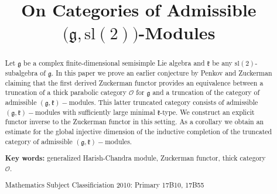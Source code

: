 \documentclass{tglat2e}
\theoremstyle{definition}
\theoremstyle{remark}
\begin{document}
\title[Admissible $\big(\mathfrak{g},\mathrm{sl}(2)\big)$-Modules]
{On  Categories of Admissible $\big(\mathfrak{g},\mathrm{sl}(2)\big)$-Modules}






\maketitle

\begin{abstract} 

	Let $\mathfrak{g}$ be a complex finite-dimensional semisimple Lie algebra and $\mathfrak{k}$ be any $\mathrm{sl}(2)$-subalgebra of $\mathfrak{g}$.  In this paper we prove an earlier conjecture by Penkov and Zuckerman claiming that the first derived Zuckerman functor provides an equivalence between a truncation of a thick parabolic category $\mathcal{O}$ for $\mathfrak{g}$ and a truncation of the category of admissible $(\mathfrak{g}, \mathfrak{k})-$modules. This latter truncated category consists of admissible $(\mathfrak{g}, \mathfrak{k})-$modules with sufficiently large minimal $\mathfrak{k}$-type. We construct an explicit functor inverse to the Zuckerman functor in this setting. As a corollary we obtain an estimate for the global injective dimension of the inductive completion of the truncated category of 
admissible $(\mathfrak{g}, \mathfrak{k})-$modules.

 
\textbf{Key words:} generalized Harish-Chandra module, Zuckerman functor, thick category $\mathcal{O}$.

Mathematics Subject Classificiation 2010: Primary 17B10, 17B55
\end{abstract}
\end{document}
